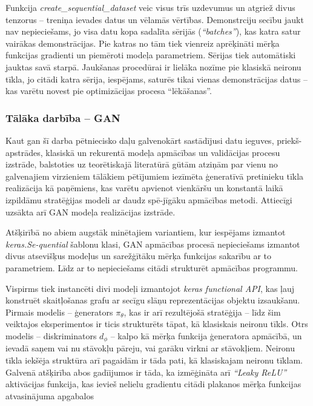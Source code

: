 \documentclass[12pt, a4paper]{article}
\numberwithin{equation}{section} %
\begin{document}
Funkcija \textit{create\_sequential\_dataset} veic visus trīs uzdevumus un atgriež divus tenzorus -- treniņa ievades datus un vēlamās vērtības. Demonstrciju secību jaukt nav nepieciešams, jo visa datu kopa sadalīta sērijās (\textit{``batches''}), kas katra satur vairākas demonstrācijas. Pie katras no tām tiek vienreiz aprēķināti mērķa funkcijas gradienti un piemēroti modeļa parametriem. Sērijas tiek automātiski jauktas savā starpā. Jaukšanas procedūrai ir lielāka nozīme pie klasiskā neironu tīkla, jo citādi katra sērija, iespējams, saturēs tikai vienas demonstrācijas datus -- kas varētu novest pie optimizācijas procesa ``lēkāšanas''.

\subsubsection{Tālāka darbība -- GAN}

Kaut gan šī darba pētniecisko daļu galvenokārt sastādījusi datu ieguves, priekš-apstrādes, klasiskā un rekurentā modeļa apmācības un validācijas procesu izstrāde, balstoties uz teorētiskajā literatūrā gūtām atziņām par vienu no galvenajiem virzieniem tālākiem pētījumiem iezīmēta ģeneratīvā pretinieku tīkla realizācija kā paņēmiens, kas varētu apvienot vienkāršu un konstantā laikā izpildāmu stratēģijas modeli ar daudz spē-jīgāku apmācības metodi. Attiecīgi uzsākta arī GAN modeļa realizācijas izstrāde.

Atšķirībā no abiem augstāk minētajiem variantiem, kur iespējams izmantot \textit{keras.Se-quential} šablonu klasi, GAN apmācības procesā nepieciešams izmantot divus atsevišķus modeļus un sarežģītāku mērķa funkcijas sakarību ar to parametriem. Līdz ar to nepieciešams citādi strukturēt apmācības programmu. 

Vispirms tiek instancēti divi modeļi izmantojot \textit{keras functional API}, kas ļauj konstruēt skaitļošanas grafu ar secīgu slāņu reprezentācijas objektu izsaukšanu. Pirmais modelis -- ģenerators $\pi_{\theta}$, kas ir arī rezultējošā stratēģija -- līdz šim veiktajos eksperimentos ir ticis strukturēts tāpat, kā klasiskais neironu tīkls. Otrs modelis -- diskriminators $d_{\phi}$ -- kalpo kā mērķa funkcija ģeneratora apmācībā, un ievadā saņem vai nu stāvokļu pāreju, vai garāku virkni ar stāvokļiem. Neironu tīkla iekšēja struktūra arī pagaidām ir tāda pati, kā klasiskajam neironu tīklam. Galvenā atšķirība abos gadīijumos ir tāda, ka izmēģināta arī \textit{``Leaky ReLU''} aktivācijas funkcija, kas ievieš nelielu gradientu citādi plakanos mērķa funkcijas atvasinājuma apgabalos
\end{document}

